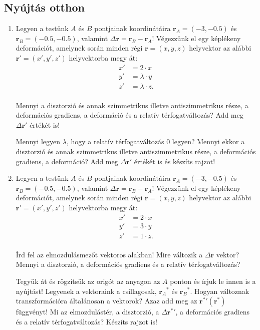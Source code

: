 \documentclass[12pt,a4paper]{scrartcl}
\let\mathbf\bm
\begin{document}
\subsection{Nyújtás otthon}
\begin{enumerate}
\item Legyen a testünk $A$ és $B$ pontjainak koordinátáira ${{\mathbf{r}}_A} = \left( { - 3, - 0.5} \right)$ és ${{\mathbf{r}}_B} = \left( { - 0.5, - 0.5} \right)$, valamint $\Delta {\mathbf{r}} = {{\mathbf{r}}_B} - {{\mathbf{r}}_A}$! Végezzünk el egy képlékeny deformációt, amelynek során minden régi ${\mathbf{r}} = \left( {x,y,z} \right)$ helyvektor az alábbi ${\mathbf{r}}' = \left( {x',y',z'} \right)$ helyvektorba megy át: 
\[\begin{aligned}
  x' &  = 2 \cdot x \\ 
  y' &  = \lambda \cdot y \\ 
  z' &  = \lambda  \cdot z. \\ 
\end{aligned} \]

Mennyi a disztorzió és annak szimmetrikus illetve antiszimmetrikus része, a deformációs gradiens, a deformáció és a relatív térfogatváltozás? Add meg $\Delta {\mathbf{r}}'$ értékét is!

Mennyi legyen $\lambda$, hogy a relatív térfogatváltozás 0 legyen? Mennyi ekkor a disztorzió és annak szimmetrikus illetve antiszimmetrikus része, a deformációs gradiens, a deformáció? Add meg $\Delta {\mathbf{r}}'$ értékét is és készíts rajzot!

\item Legyen a testünk $A$ és $B$ pontjainak koordinátáira ${{\mathbf{r}}_A} = \left( { - 3, - 0.5} \right)$ és ${{\mathbf{r}}_B} = \left( { - 0.5, - 0.5} \right)$, valamint $\Delta {\mathbf{r}} = {{\mathbf{r}}_B} - {{\mathbf{r}}_A}$! Végezzünk el egy képlékeny deformációt, amelynek során minden régi ${\mathbf{r}} = \left( {x,y,z} \right)$ helyvektor az alábbi ${\mathbf{r}}' = \left( {x',y',z'} \right)$ helyvektorba megy át: 
\[\begin{aligned}
  x' &  = 2 \cdot x \\ 
  y' &  = 3 \cdot y \\ 
  z' &  = 1 \cdot z. \\ 
\end{aligned} \]

Írd fel az elmozdulásmezőt vektoros alakban! Mire változik a $\Delta {\mathbf{r}}$ vektor? Mennyi a disztorzió, a deformációs gradiens és a relatív térfogatváltozás?

Tegyük át és rögzítsük az origót az anyagon az $A$ ponton és írjuk le innen is a nyújtást! Legyenek a vektoraink a csillagosak, ${{\mathbf{r}}_A}^*$ és ${{\mathbf{r}}_B}^*$. Hogyan változnak transzformációra általánosan a vektorok? Azaz add meg az ${\mathbf{r}}{{^*}'}\left( {{{\mathbf{r}}^ * }} \right)$ függvényt! Mi az elmozdulástér, a disztorzió, a $\Delta {{\mathbf{r}}^ * }'$, a deformációs gradiens és a relatív térfogatváltozás? Készíts rajzot is!
\end{enumerate}
\end{document}
